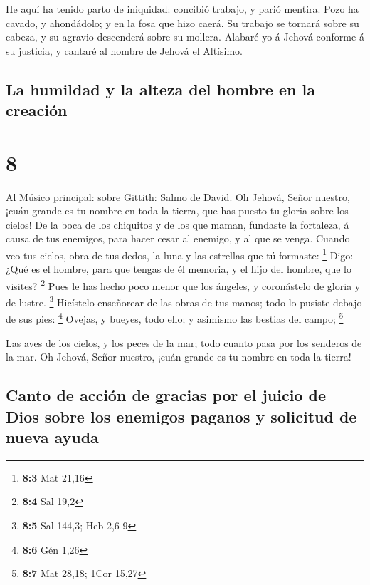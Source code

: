  He aquí ha tenido parto de iniquidad: concibió trabajo, y
parió mentira.  Pozo ha cavado, y ahondádolo; y en la fosa
que hizo caerá.  Su trabajo se tornará sobre su cabeza, y
su agravio descenderá sobre su mollera.  Alabaré yo á
Jehová conforme á su justicia, y cantaré al nombre de Jehová el
Altísimo.

\hypertarget{la-humildad-y-la-alteza-del-hombre-en-la-creaciuxf3n}{%
\subsection{La humildad y la alteza del hombre en la
creación}\label{la-humildad-y-la-alteza-del-hombre-en-la-creaciuxf3n}}

\hypertarget{section-7}{%
\section{8}\label{section-7}}

 Al Músico principal: sobre Gittith: Salmo de David. Oh
Jehová, Señor nuestro, ¡cuán grande es tu nombre en toda la tierra, que
has puesto tu gloria sobre los cielos!  De la boca de los
chiquitos y de los que maman, fundaste la fortaleza, á causa de tus
enemigos, para hacer cesar al enemigo, y al que se venga. 
Cuando veo tus cielos, obra de tus dedos, la luna y las estrellas que tú
formaste: \footnote{\textbf{8:3} Mat 21,16}  Digo: ¿Qué es
el hombre, para que tengas de él memoria, y el hijo del hombre, que lo
visites? \footnote{\textbf{8:4} Sal 19,2}  Pues le has hecho
poco menor que los ángeles, y coronástelo de gloria y de lustre.
\footnote{\textbf{8:5} Sal 144,3; Heb 2,6-9}  Hicístelo
enseñorear de las obras de tus manos; todo lo pusiste debajo de sus
pies: \footnote{\textbf{8:6} Gén 1,26}  Ovejas, y bueyes,
todo ello; y asimismo las bestias del campo; \footnote{\textbf{8:7} Mat
  28,18; 1Cor 15,27}

 Las aves de los cielos, y los peces de la mar; todo cuanto
pasa por los senderos de la mar.  Oh Jehová, Señor nuestro,
¡cuán grande es tu nombre en toda la tierra!

\hypertarget{canto-de-acciuxf3n-de-gracias-por-el-juicio-de-dios-sobre-los-enemigos-paganos-y-solicitud-de-nueva-ayuda}{%
\subsection{Canto de acción de gracias por el juicio de Dios sobre los
enemigos paganos y solicitud de nueva
ayuda}\label{canto-de-acciuxf3n-de-gracias-por-el-juicio-de-dios-sobre-los-enemigos-paganos-y-solicitud-de-nueva-ayuda}}

